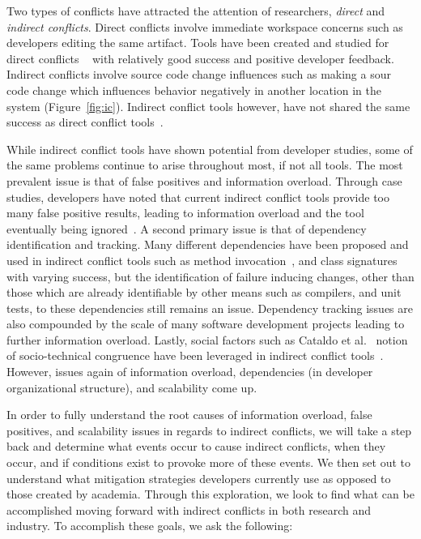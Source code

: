 \documentclass[conference]{IEEEtran}
\begin{document}
Two types of conflicts have attracted the attention of researchers, \textit{direct} and 
\textit{indirect conflicts}. Direct conflicts involve immediate workspace concerns such as developers editing the same
artifact. Tools have been created and studied for direct conflicts
~\cite{Xiang:2008:ERT, Biehl:2007:FVD, Sarma:2009:TIV, Khurana:2009:PFC} with relatively good success and 
positive developer feedback. Indirect conflicts involve source code change influences such as making a sour code change 
which influences behavior negatively in another location in the system (Figure~\ref{fig:ic}). Indirect conflict tools however, have
not shared the same success as direct conflict 
tools~\cite{Sarma:2007:TSA, Holmes:2010:CAR, Trainer:2005:BGT, Servant:2010:CPI, Borici:2012:CHA}.

While indirect conflict tools have shown potential from developer studies, some of the same problems continue
to arise throughout most, if not all tools. The most prevalent issue is that of false positives and information
overload. Through case studies, developers have noted that current indirect conflict tools provide too many 
false positive results, leading to information overload and the tool eventually being
ignored~\cite{Sarma:2007:TSA, Servant:2010:CPI}. A second primary issue is that of dependency identification and
tracking. Many different dependencies have been proposed and used in indirect conflict tools such as method 
invocation~\cite{Trainer:2005:BGT}, and class signatures~\cite{Sarma:2007:TSA} with varying success, but the 
identification of failure inducing changes, other than those which are already identifiable by other means such
as compilers, and unit tests, to these dependencies still remains an issue. Dependency tracking issues are
also compounded by the scale of many software development projects leading to further information overload.
Lastly, social factors such as Cataldo et al.~\cite{Cataldo:2006:ICR} notion of socio-technical
congruence have been leveraged in indirect conflict tools~\cite{Kwan:2011:ESC, Begel:2010:CDE, Borici:2012:CHA}.
However, issues again of information overload, dependencies (in developer organizational structure), and scalability 
come up.

In order to fully understand the root causes of information overload, false positives, and
scalability issues in regards to indirect conflicts, we will take a step back and determine what events occur to
cause indirect conflicts, when they occur, and if conditions exist to provoke more of these events. 
We then set out to understand what mitigation strategies developers currently use as opposed to those created
by academia. Through this exploration, we look to find what can be accomplished moving forward with indirect conflicts
in both research and industry. To accomplish these goals, we ask the following: 
\end{document}
